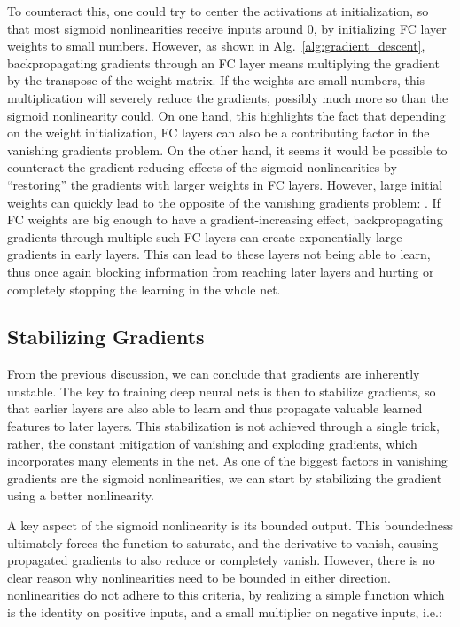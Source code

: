 			To counteract this, one could try to center the activations at initialization, so that most sigmoid nonlinearities receive inputs around $0$, by initializing \ac{FC} layer weights to small numbers.
			However, as shown in Alg.~\ref{alg:gradient_descent}, backpropagating gradients through an \ac{FC} layer means multiplying the gradient by the transpose of the weight matrix.
			If the weights are small numbers, this multiplication will severely reduce the gradients, possibly much more so than the sigmoid nonlinearity could.
			On one hand, this highlights the fact that depending on the weight initialization, \ac{FC} layers can also be a contributing factor in the vanishing gradients problem.
			On the other hand, it seems it would be possible to counteract the gradient-reducing effects of the sigmoid nonlinearities by ``restoring'' the gradients with larger weights in \ac{FC} layers.
			However, large initial weights can quickly lead to the opposite of the vanishing gradients problem: .
			If \ac{FC} weights are big enough to have a gradient-increasing effect, backpropagating gradients through multiple such \ac{FC} layers can create exponentially large gradients in early layers.
			This can lead to these layers not being able to learn, thus once again blocking information from reaching later layers and hurting or completely stopping the learning in the whole net.
			
		\subsection{Stabilizing Gradients}
			\label{cha:deep_learning:sec:gradient_stab}
	
			From the previous discussion, we can conclude that gradients are inherently unstable.
			The key to training deep neural nets is then to stabilize gradients, so that earlier layers are also able to learn and thus propagate valuable learned features to later layers.
			This stabilization is not achieved through a single trick, rather, the constant mitigation of vanishing and exploding gradients, which incorporates many elements in the net.
			As one of the biggest factors in vanishing gradients are the sigmoid nonlinearities, we can start by stabilizing the gradient using a better nonlinearity.
			
			A key aspect of the sigmoid nonlinearity is its bounded output.
			This boundedness ultimately forces the function to saturate, and the derivative to vanish, causing propagated gradients to also reduce or completely vanish.
			However, there is no clear reason why nonlinearities need to be bounded in either direction.
			 nonlinearities do not adhere to this criteria, by realizing a simple function which is the identity on positive inputs, and a small multiplier on negative inputs, i.e.:
				
